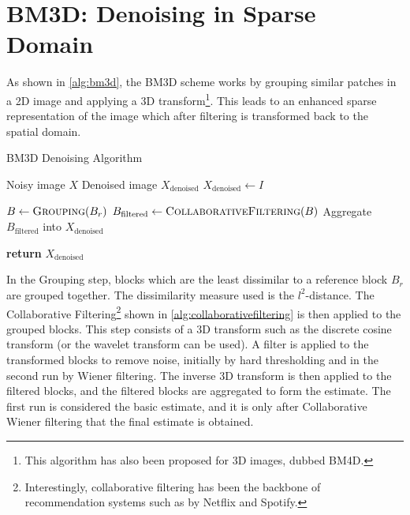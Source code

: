 \section{BM3D: Denoising in Sparse Domain}
As shown in \cref{alg:bm3d}, the \gls{BM3D} scheme works by grouping similar patches in a 2D image and applying a 3D transform\footnote{This algorithm has also been proposed for 3D images, dubbed BM4D.}. This leads to an enhanced sparse representation of the image which after filtering is transformed back to the spatial domain.
\begin{algorithm}
    \caption{BM3D Denoising Algorithm}\label{alg:bm3d}
    \begin{algorithmic}[1]
    \Require Noisy image $X$
    \Ensure Denoised image $X_{\text{denoised}}$
    \Statex
        \State $X_{\text{denoised}} \gets I$
        
            \State $B \gets \textsc{Grouping}(B_r)$
            \State $B_{\text{filtered}} \gets \textsc{CollaborativeFiltering}(B)$
            \State Aggregate $B_{\text{filtered}}$ into $X_{\text{denoised}}$
        \EndFor
        
        \State \textbf{return} $X_{\text{denoised}}$
    \EndProcedure
    \end{algorithmic}
\end{algorithm}

In the Grouping step, blocks which are the least dissimilar to a reference block $B_r$ are grouped together. The dissimilarity measure used is the $l^2$-distance. The Collaborative Filtering\footnote{Interestingly, collaborative filtering has been the backbone of recommendation systems such as by Netflix and Spotify.} shown in \cref{alg:collaborativefiltering} is then applied to the grouped blocks. This step consists of a 3D transform such as the discrete cosine transform (or the wavelet transform can be used). A filter is applied to the transformed blocks to remove noise, initially by hard thresholding and in the second run by Wiener filtering. The inverse 3D transform is then applied to the filtered blocks, and the filtered blocks are aggregated to form the estimate. The first run is considered the basic estimate, and it is only after Collaborative Wiener filtering that the final estimate is obtained.
    
